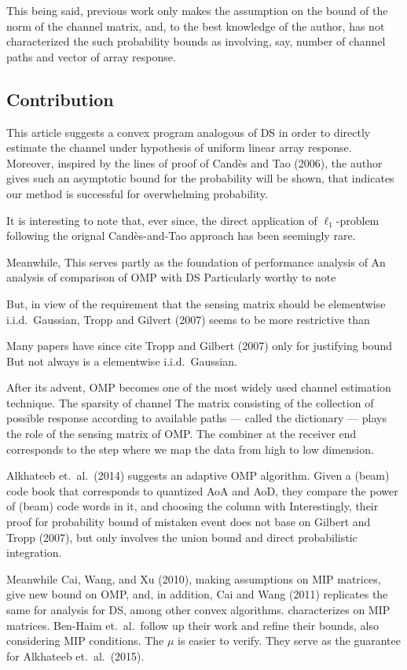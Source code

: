 \documentclass[12pt]{article}
\begin{document}
This being said, previous work only makes the assumption on the bound of the norm of the channel matrix, and, to the best knowledge of the author, has not characterized the such probability bounds as involving, say, number of channel paths and vector of array response.

\subsection{Contribution}

This article suggests a convex program analogous of DS in order to directly estimate the channel under hypothesis of uniform linear array response.
Moreover, inspired by the lines of proof of Cand\`es and Tao (2006), the author gives such an asymptotic bound for the probability will be shown, that indicates our method is successful for overwhelming probability.

It is interesting to note that, ever since, the direct application of \(\ell_1\)-problem following the orignal Cand\`es-and-Tao approach has been seemingly rare.

Meanwhile, 
This serves partly as the foundation of performance analysis of 
An analysis of comparison of OMP with DS
Particularly worthy to note

But, in view of the requirement that the sensing matrix should be elementwise i.i.d.\ Gaussian, Tropp and Gilvert (2007) seems to be more restrictive than 

Many papers have since cite Tropp and Gilbert (2007) only for justifying bound
But not always is a elementwise i.i.d.\ Gaussian.

After its advent, OMP becomes one of the most widely used channel estimation technique.
The sparsity of channel 
The matrix consisting of the collection of possible response according to available paths --- called the dictionary --- plays the role of the sensing matrix of OMP.
The combiner at the receiver end corresponds to the step where we map the data from high to low dimension.

Alkhateeb et.\ al.\ (2014) suggests an adaptive OMP algorithm.
Given a (beam) code book that corresponds to quantized AoA and AoD, they compare the power of (beam) code words in it, and choosing the column with 
Interestingly, their proof for probability bound of mistaken event does not base on Gilbert and Tropp (2007), but only involves the union bound and direct probabilistic integration.

Meanwhile Cai, Wang, and Xu (2010), making assumptions on MIP matrices, give new bound on OMP, and, in addition, Cai and Wang (2011) replicates the same for analysis for DS, among other convex algorithms.
characterizes on MIP matrices.
Ben-Haim et.\ al.\ follow up their work and refine their bounds, also considering MIP conditions.
The \(\mu\) is easier to verify.
They serve as the guarantee for Alkhateeb et.\ al.\ (2015).
\end{document}
